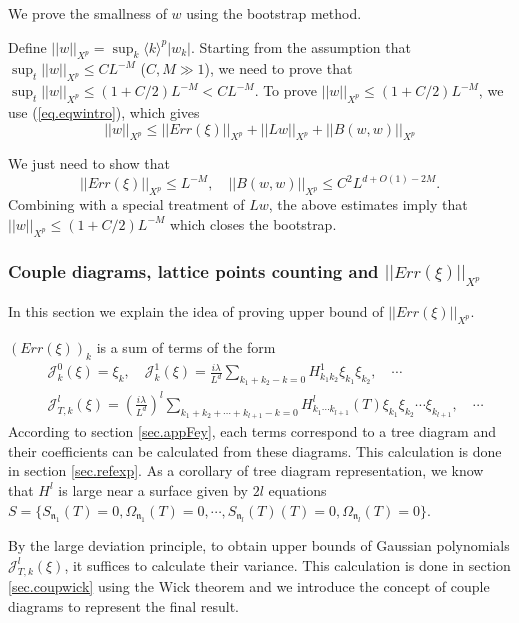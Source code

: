 We prove the smallness of $w$ using the bootstrap method.

Define $||w||_{X^p}=\sup_{k} \langle k\rangle^{p} |w_k|$. Starting from the assumption that $\sup_t||w||_{X^p}\le CL^{-M}$ ($C,M\gg 1$), we need to prove that $\sup_t||w||_{X^p}\le (1+C/2)L^{-M}<CL^{-M}$. To prove $||w||_{X^p}\le (1+C/2)L^{-M}$, we use (\ref{eq.eqwintro}), which gives
\begin{equation}\label{eq.ineqw}
    ||w||_{X^p}\le ||Err(\xi)||_{X^p}+||Lw||_{X^p}+||B(w,w)||_{X^p}
\end{equation}

We just need to show that 
\begin{equation}
    ||Err(\xi)||_{X^p}\le L^{-M},
    \quad ||B(w,w)||_{X^p}\le C^2L^{d+O(1)-2M}.
\end{equation}
Combining with a special treatment of $Lw$, the above estimates imply that $||w||_{X^p}\le (1+C/2)L^{-M}$ which closes the bootstrap.


\subsubsection{Couple diagrams, lattice points counting and $||Err(\xi)||_{X^p}$}\label{sec.latticeintro} In this section we explain the idea of proving upper bound of $||Err(\xi)||_{X^p}$.

$(Err(\xi))_{k}$ is a sum of terms of the form
\begin{equation}
\begin{split}
    &\mathcal{J}_{k}^0(\xi)=  \xi_k, \quad \mathcal{J}_k^1(\xi)=\frac{i\lambda}{L^{d}} \sum_{k_1+k_2-k=0} H^1_{k_1k_2}  \xi_{k_1}\xi_{k_2} , \quad\cdots  \\
    &\mathcal{J}_{T,k}^l(\xi)=\left(\frac{i\lambda}{L^{d}}\right)^l\sum_{k_1+k_2+\cdots+k_{l+1}-k=0} H^l_{k_1\cdots k_{l+1}}(T)  \xi_{k_1}\xi_{k_2}\cdots\xi_{k_{l+1}}, \quad\cdots 
\end{split}
\end{equation}
According to section \ref{sec.appFey}, each terms correspond to a tree diagram and their coefficients can be calculated from these diagrams. This calculation is done in section \ref{sec.refexp}. As a corollary of tree diagram representation, we know that $H^l$ is large near a surface given by $2l$ equations $S=\{S_{\mathfrak{n}_1}(T)=0,\Omega_{\mathfrak{n}_1}(T)=0,\cdots,S_{\mathfrak{n}_{l}}(T)(T)=0,\Omega_{\mathfrak{n}_l}(T)=0\}$.

By the large deviation principle, to obtain upper bounds of Gaussian polynomials $\mathcal{J}_{T,k}^l(\xi)$, it suffices to calculate their variance. This calculation is done in section \ref{sec.coupwick} using the Wick theorem and we introduce the concept of couple diagrams to represent the final result. 

